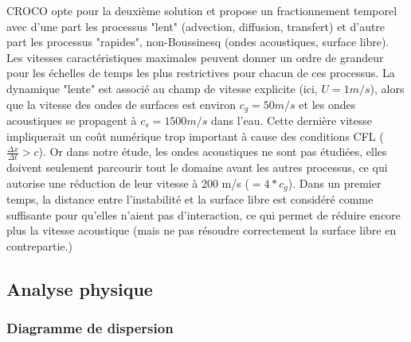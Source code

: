 \documentclass[a4paper,12pt]{article}
\begin{document}
    CROCO opte pour la deuxième solution et propose un fractionnement temporel avec d'une part les processus "lent" (advection, diffusion, transfert) et d'autre part les processus "rapides", non-Boussinesq (ondes acoustiques, surface libre). Les vitesses caractéristiques maximales peuvent donner un ordre de grandeur pour les échelles de temps les plus restrictives pour chacun de ces processus. La dynamique "lente" est associé au champ de vitesse explicite (ici, $U=1 m/s$), alors que la vitesse des ondes de surfaces est environ $c_g=50 m/s$ et les ondes acoustiques se propagent à $c_s=1500 m/s$ dans l'eau. Cette dernière vitesse impliquerait un coût numérique trop important à cause des conditions CFL ($\frac{\Delta x}{\Delta t}>c$). Or dans notre étude, les ondes acoustiques ne sont pas étudiées, elles doivent seulement parcourir tout le domaine avant les autres processus, ce qui autorise une réduction de leur vitesse à 200 m/s ($=4*c_g$). Dans un premier temps, la distance entre l'instabilité et la surface libre est considéré comme suffisante pour qu'elles n'aient pas d'interaction, ce qui permet de réduire encore plus la vitesse acoustique (mais ne pas résoudre correctement la surface libre en contrepartie.)\\

    \subsection{Analyse physique}
    
        \subsubsection{Diagramme de dispersion}
        
\end{document}
